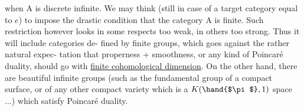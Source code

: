 when A is discrete infinite.   We may think (still in case of
a target category equal to $e$) to impose the drastic condition that the
category A is finite.  Such restriction however looks in some respects
too weak,  in others too strong.  Thus it will include categories de-%
fined by finite groups, which goes against the rather natural expec-%
tation that properness + smoothness,  or any kind of Poincaré duality,
should go with \uline{finite cohomological dimension}.  On the other hand,
there are beautiful infinite groups (such as the fundamental group
of a  compact surface,  or of any other compact variety which is a
$K(\hand{$\pi$},1)$ space ...) which satisfy Poincaré duality.

